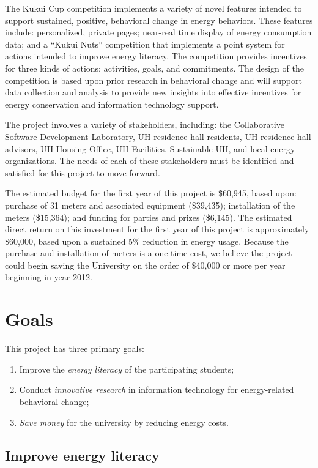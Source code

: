 \documentclass[11pt]{article}
\begin{document}
The Kukui Cup competition implements a variety of novel
features intended to support sustained, positive, behavioral change in
energy behaviors.  These features include: personalized, private pages;
near-real time display of energy consumption data; and a ``Kukui Nuts''
competition that implements a point system for actions intended to improve
energy literacy.  The competition provides incentives for three kinds of
actions: activities, goals, and commitments.  The design of the competition
is based upon prior research in behavioral change and will support data
collection and analysis to provide new insights into effective incentives
for energy conservation and information technology support.

The project involves a variety of stakeholders, including: the
Collaborative Software Development Laboratory, UH residence hall residents, UH 
residence hall advisors, UH Housing Office, UH Facilities, Sustainable UH, and
local energy organizations.  The needs of each of these stakeholders must
be identified and satisfied for this project to move forward.

The estimated budget for the first year of this project is \$60,945, based
upon: purchase of 31 meters and associated equipment (\$39,435);
installation of the meters (\$15,364); and funding for parties and prizes
(\$6,145).  The estimated direct return on this investment for the first
year of this project is approximately \$60,000, based upon a sustained 5\%
reduction in energy usage.  Because the purchase and installation of meters
is a one-time cost, we believe the project could begin saving the
University on the order of \$40,000 or more per year beginning in year
2012.


\newpage
\section{Goals}

This project has three primary goals:
\begin{enumerate}
\item Improve the {\em energy literacy} of the participating students;
\item Conduct {\em innovative research} in information technology for
  energy-related behavioral change;
\item {\em Save money} for the university by reducing energy costs.
\end{enumerate}

\subsection{Improve energy literacy}
\end{document}
